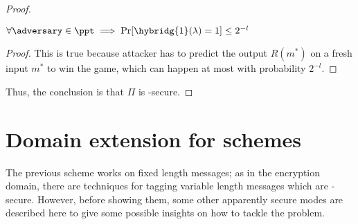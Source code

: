 \begin{proof}
\begin{cryptoredux}
        \cseqbeginloop
        \cseqendloop

        \cseqdelay
    

        \cseqdelay

        
    \end{cryptoredux}

    \begin{lemma}
        $\forall \adversary \in \ppt \implies \Pr[\hybridg{1}(\lambda) = 1] \leq 2^{-l}$
    \end{lemma}

    \begin{proof}
        This is true because attacker has to predict the output $R(m^*)$ on a fresh input $m^*$ to win the game, which can happen at most with probability $2^{-l}$.
    \end{proof}

    Thus, the conclusion is that $\Pi$ is \ufcma-secure.
\end{proof}


\section{Domain extension for \mac{} schemes}

The previous scheme works on fixed length messages; as in the encryption domain, there are techniques for tagging variable length messages which are \ufcma-secure. However, before showing them, some other apparently secure modes are described here to give some possible insights on how to tackle the problem. 

